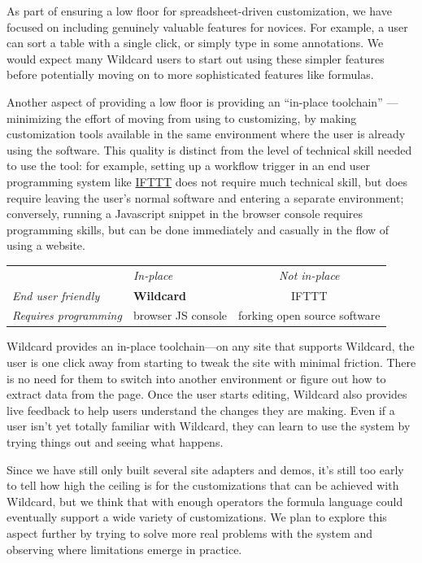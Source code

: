 \documentclass[english,submission]{programming}
\begin{document}
As part of ensuring a low floor for spreadsheet-driven customization, we
have focused on including genuinely valuable features for novices. For
example, a user can sort a table with a single click, or simply type in
some annotations. We would expect many Wildcard users to start out using
these simpler features before potentially moving on to more
sophisticated features like formulas.

Another aspect of providing a low floor is providing an ``in-place
toolchain'' \autocite{inkandswitch2019}---minimizing the effort of
moving from using to customizing, by making customization tools
available in the same environment where the user is already using the
software. This quality is distinct from the level of technical skill
needed to use the tool: for example, setting up a workflow trigger in an
end user programming system like \href{https://ifttt.com/}{IFTTT} does
not require much technical skill, but does require leaving the user's
normal software and entering a separate environment; conversely, running
a Javascript snippet in the browser console requires programming skills,
but can be done immediately and casually in the flow of using a website.

\begin{longtable}[]{@{}llc@{}}
\toprule
\endhead
& \emph{In-place} & \emph{Not in-place}\tabularnewline
\emph{End user friendly} & \textbf{Wildcard} & IFTTT\tabularnewline
\emph{Requires programming} & browser JS console & forking open source
software\tabularnewline
\bottomrule
\end{longtable}

Wildcard provides an in-place toolchain---on any site that supports
Wildcard, the user is one click away from starting to tweak the site
with minimal friction. There is no need for them to switch into another
environment or figure out how to extract data from the page. Once the
user starts editing, Wildcard also provides live feedback to help users
understand the changes they are making. Even if a user isn't yet totally
familiar with Wildcard, they can learn to use the system by trying
things out and seeing what happens.

Since we have still only built several site adapters and demos, it's
still too early to tell how high the ceiling is for the customizations
that can be achieved with Wildcard, but we think that with enough
operators the formula language could eventually support a wide variety
of customizations. We plan to explore this aspect further by trying to
solve more real problems with the system and observing where limitations
emerge in practice.
\end{document}
